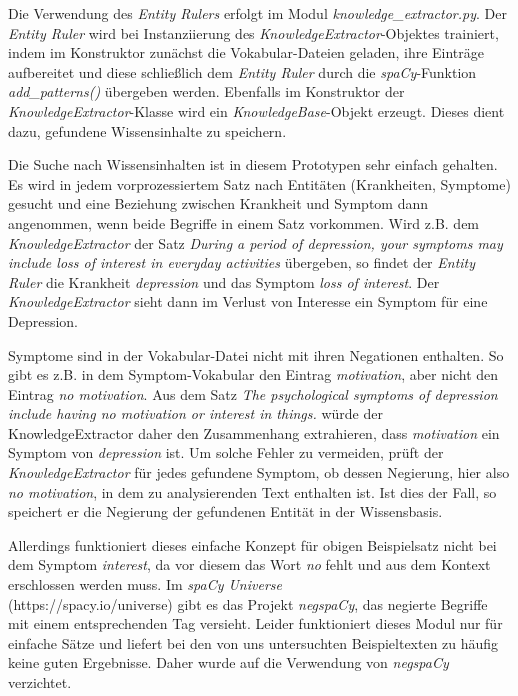 Die Verwendung des \emph{Entity Rulers} erfolgt im Modul \emph{knowledge\_extractor.py}. Der \emph{Entity Ruler} wird bei Instanziierung des \emph{KnowledgeExtractor}-Objektes trainiert, indem im Konstruktor zunächst die Vokabular-Dateien geladen, ihre Einträge aufbereitet und diese schließlich dem \emph{Entity Ruler} durch die \emph{spaCy}-Funktion \emph{add\_patterns()} übergeben werden. Ebenfalls im Konstruktor der \emph{KnowledgeExtractor}-Klasse wird ein \emph{KnowledgeBase}-Objekt erzeugt. Dieses dient dazu, gefundene Wissensinhalte zu speichern.

Die Suche nach Wissensinhalten ist in diesem Prototypen sehr einfach gehalten. Es wird in jedem vorprozessiertem Satz nach Entitäten (Krankheiten, Symptome) gesucht und eine Beziehung zwischen Krankheit und Symptom dann angenommen, wenn beide Begriffe in einem Satz vorkommen. Wird z.B. dem \emph{KnowledgeExtractor} der Satz \emph{\glqq During a period of depression, your symptoms may include loss of interest in everyday activities\flqq} übergeben, so findet der \emph{Entity Ruler} die Krankheit \emph{depression} und das Symptom \emph{loss of interest}. Der \emph{KnowledgeExtractor} sieht dann im Verlust von Interesse ein Symptom für eine Depression.

Symptome sind in der Vokabular-Datei nicht mit ihren Negationen enthalten. So gibt es z.B. in dem Symptom-Vokabular den Eintrag \emph{motivation}, aber nicht den Eintrag \emph{no motivation}. Aus dem Satz \emph{\glqq The psychological symptoms of depression include having no motivation or interest in things.\flqq} würde der KnowledgeExtractor daher den Zusammenhang extrahieren, dass \emph{motivation} ein Symptom von \emph{depression} ist. Um solche Fehler zu vermeiden, prüft der \emph{KnowledgeExtractor} für jedes gefundene Symptom, ob dessen Negierung, hier also \emph{no motivation}, in dem zu analysierenden Text enthalten ist. Ist dies der Fall, so speichert er die Negierung der gefundenen Entität in der Wissensbasis.

Allerdings funktioniert dieses einfache Konzept für obigen Beispielsatz nicht bei dem Symptom \emph{interest}, da vor diesem das Wort \emph{no} fehlt und aus dem Kontext erschlossen werden muss. Im \emph{spaCy Universe} \\
(https://spacy.io/universe) gibt es das Projekt \emph{negspaCy}, das negierte Begriffe mit einem entsprechenden Tag versieht. Leider funktioniert dieses Modul nur für einfache Sätze und liefert bei den von uns untersuchten Beispieltexten zu häufig keine guten Ergebnisse. Daher wurde auf die Verwendung von \emph{negspaCy} verzichtet.

